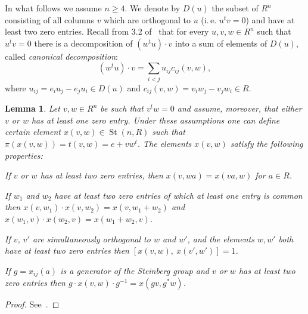 \documentclass[oneside, 10pt]{amsart}
\DeclareMathOperator{\St}{St}
\numberwithin{equation}{section}
\numberwithin{thm}{section}
\newtheorem{lemma}[thm]{Lemma}
\numberwithin{lemma}{section}
\theoremstyle{definition}
\theoremstyle{remark}
\begin{document}
In what follows we assume $n \geq 4$.
We denote by $D(u)$ the subset of $R^n$ consisting of all columns $v$ which are orthogonal to $u$
(i.\,e. $u^{t} v = 0$) and have at least two zero entries.
Recall from 3.2 of~\cite{Ka77} that for every $u, v, w \in R^n$ such that $u^t v = 0$ there
is a decomposition of $(w^t u) \cdot v$ into a sum of elements of $D(u)$, called \textit{canonical decomposition}:
\begin{equation}
\label{eq:canonical} (w^tu) \cdot v=\sum_{i<j}u_{ij} c_{ij}(v, w),
\end{equation}
where $u_{ij} =e_i u_j-e_j u_i \in D(u)$ and $c_{ij}(v, w) =v_i w_j-v_j w_i \in R$.

\begin{lemma}
\label{lem:xsmall-properties}
Let $v, w \in R^n$ be such that $v^t w = 0$ and assume, moreover, that either $v$ or $w$ has at least one zero entry.
Under these assumptions one can define certain element $x(v, w) \in \St(n, R)$ such that $\pi(x(v, w)) = t(v, w) = e + vw^t$.
The elements $x(v, w)$ satisfy the following properties:
\begin{lemlist}
\item \label{itm:xsmall-scalar} If $v$ or $w$ has at least two zero entries, then $x(v, wa) = x(va, w)$ for $a\in R$.
\item \label{itm:xsmall-additivity} If $w_1$ and $w_2$ have at least two zero entries of which at least one entry is common
then $x(v, w_1) \cdot x(v, w_2) = x(v, w_1+w_2)$ and $x(w_1, v) \cdot x(w_2, v) = x(w_1 + w_2, v)$.
\item \label{itm:xsmall-commute} If $v$, $v'$ are simultaneously orthogonal to $w$ and $w'$, and the elements $w, w'$ both have at least two zero entries then
$[x(v, w),\ x(v', w')] = 1$.
\item \label{itm:xsmall-conj} If $g = x_{ij}(a)$ is a generator of the Steinberg group and $v$ or $w$ has at least two zero entries then
$g \cdot x(v, w) \cdot g^{-1} = x(gv, g^*w)$.
\end{lemlist}
\end{lemma}
\begin{proof}
See~\cite[Lemma~1.1]{Tu83}.
\end{proof}
\end{document}
